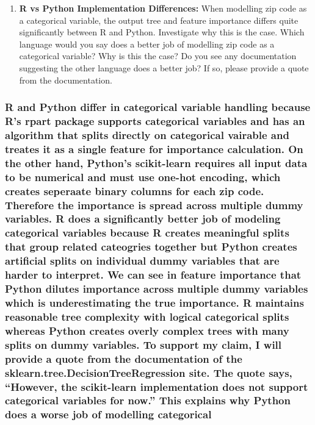 \documentclass[
  letterpaper,
  DIV=11,
  numbers=noendperiod]{scrartcl}
\providecommand{\tightlist}{%
  \setlength{\itemsep}{0pt}\setlength{\parskip}{0pt}}
\begin{document}
\begin{enumerate}
\def\labelenumi{\arabic{enumi}.}
\setcounter{enumi}{1}
\tightlist
\item
  \textbf{R vs Python Implementation Differences:} When modelling zip
  code as a categorical variable, the output tree and feature importance
  differs quite significantly between R and Python. Investigate why this
  is the case. Which language would you say does a better job of
  modelling zip code as a categorical variable? Why is this the case? Do
  you see any documentation suggesting the other language does a better
  job? If so, please provide a quote from the documentation.
\end{enumerate}

\subsubsection{R and Python differ in categorical variable handling
because R's rpart package supports categorical variables and has an
algorithm that splits directly on categorical vairable and treates it as
a single feature for importance calculation. On the other hand, Python's
scikit-learn requires all input data to be numerical and must use
one-hot encoding, which creates seperaate binary columns for each zip
code. Therefore the importance is spread across multiple dummy
variables. R does a significantly better job of modeling categorical
variables because R creates meaningful splits that group related
cateogries together but Python creates artificial splits on individual
dummy variables that are harder to interpret. We can see in feature
importance that Python dilutes importance across multiple dummy
variables which is underestimating the true importance. R maintains
reasonable tree complexity with logical categorical splits whereas
Python creates overly complex trees with many splits on dummy variables.
To support my claim, I will provide a quote from the documentation of
the sklearn.tree.DecisionTreeRegression site. The quote says, ``However,
the scikit-learn implementation does not support categorical variables
for now.'' This explains why Python does a worse job of modelling
categorical
}
\end{document}
